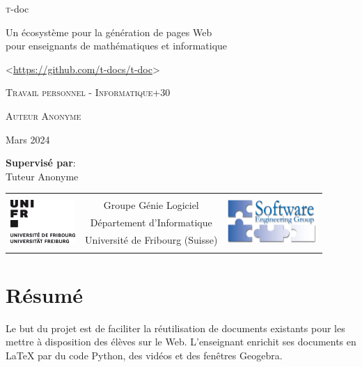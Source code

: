 \documentclass[12pt,titlepage,oneside]{article}
\newcommand{\authorname}{Caroline Blank}
\newcommand{\tutorname}{Prof. Dr. Jacques Pasquier\\
Software Engineering Group\\}
\newcommand{\titlename}{t-doc}
\newcommand{\subtitlename}{Un écosystème pour la génération de pages Web\\ pour enseignants de mathématiques et informatique}
\newcommand{\worktype}{Travail personnel - Informatique+30}
\newcommand{\workdate}{Mars 2024}
\newcommand{\supervisorslabel}{Supervisé par}
\renewcommand{\authorname}{Auteur Anonyme}
\renewcommand{\tutorname}{Tuteur Anonyme}
\newcommand{\titlepagefooter}{
\begin{tabular}{lcr} \hline
\multirow{5}{*}{\includegraphics[height=1.65cm]{unifr_logo}} &  & \multirow{5}{*}{\includegraphics[height=1.65cm]{softeng}} \\
& Groupe Génie Logiciel &  \\
& Département d'Informatique &  \\
& Université de Fribourg (Suisse) &  \\
& & \\
\end{tabular}
}
\begin{document}
\begin{titlepage}
\begin{center}

  \vspace*{0.3cm}
  \begin{huge}
    \textsc\titlename \\
  \end{huge}
  \vspace{0.4cm}
  \begin{Large}
  \subtitlename
  \end{Large}
  \par

  \vspace{0.5cm}
  <\url{https://github.com/t-docs/t-doc}>



  \vspace*{2cm}

  \begin{normalsize}
  \textsc{\worktype}
  \end{normalsize}

  \vspace*{1.5cm}
  \begin{LARGE}
  \textsc{\authorname}\\
      \vspace{0.2cm}
  \end{LARGE}
  \begin{large}
    {\workdate}
  \end{large}

  \vspace*{3cm}

  \textbf{\supervisorslabel}:\\
  \vspace{0.2cm}
  \tutorname
  \vspace*{2cm}

  \titlepagefooter


\end{center}
\end{titlepage}

\section*{Résumé}
Le but du projet est de faciliter la réutilisation de documents existants pour les mettre à disposition des élèves sur le Web. L'enseignant enrichit ses documents en LaTeX par du code Python, des vidéos et des fenêtres Geogebra.
\end{document}
